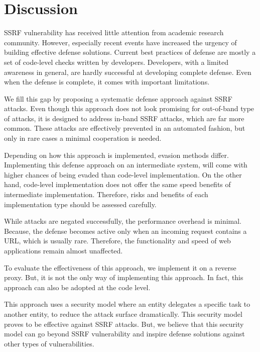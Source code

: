 \section{Discussion}
\label{sec:discussion}


SSRF vulnerability has received little attention from academic research community. However, especially recent events have increased the urgency of building effective defense solutions. Current best practices of defense are mostly a set of code-level checks written by developers. Developers, with a limited awareness in general, are hardly successful at developing complete defense. Even when the defense is complete, it comes with important limitations. 

We fill this gap by proposing a systematic defense approach against SSRF attacks. Even though this approach does not look promising for out-of-band type of attacks, it is designed to address in-band SSRF attacks, which are far more common. These attacks are effectively prevented in an automated fashion, but only in rare cases a minimal cooperation is needed. 

Depending on how this approach is implemented, evasion methods differ. Implementing this defense approach on an intermediate system, will come with higher chances of being evaded than code-level implementation. On the other hand, code-level implementation does not offer the same speed benefits of intermediate implementation. Therefore, risks and benefits of each implementation type should be assessed carefully. 

While attacks are negated successfully, the performance overhead is minimal. Because, the defense becomes active only when an incoming request contains a URL, which is usually rare. Therefore, the functionality and speed of web applications remain almost unaffected. 

To evaluate the effectiveness of this approach, we implement it on a reverse proxy. But, it is not the only way of implementing this approach. In fact, this approach can also be adopted at the code level. 

This approach uses a security model where an entity delegates a specific task to another entity, to reduce the attack surface dramatically. This security model proves to be effective against SSRF attacks. But, we believe that this security model can go beyond SSRF vulnerability and inspire defense solutions against other types of vulnerabilities.   
